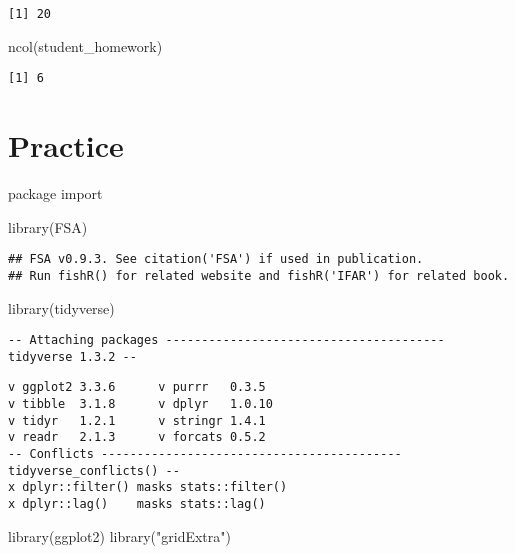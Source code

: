 \documentclass[
  letterpaper,
  DIV=11,
  numbers=noendperiod]{scrartcl}
\newenvironment{Shaded}{\begin{snugshade}}{\end{snugshade}}
\newcommand{\FunctionTok}[1]{\textcolor[rgb]{0.28,0.35,0.67}{#1}}
\newcommand{\NormalTok}[1]{\textcolor[rgb]{0.00,0.23,0.31}{#1}}
\newcommand{\StringTok}[1]{\textcolor[rgb]{0.13,0.47,0.30}{#1}}
\begin{document}
\begin{verbatim}
[1] 20
\end{verbatim}

\begin{Shaded}
\begin{Highlighting}[]
\FunctionTok{ncol}\NormalTok{(student\_homework)}
\end{Highlighting}
\end{Shaded}

\begin{verbatim}
[1] 6
\end{verbatim}

\hypertarget{practice}{%
\section{Practice}\label{practice}}

package import

\begin{Shaded}
\begin{Highlighting}[]
\FunctionTok{library}\NormalTok{(FSA)}
\end{Highlighting}
\end{Shaded}

\begin{verbatim}
## FSA v0.9.3. See citation('FSA') if used in publication.
## Run fishR() for related website and fishR('IFAR') for related book.
\end{verbatim}

\begin{Shaded}
\begin{Highlighting}[]
\FunctionTok{library}\NormalTok{(tidyverse)}
\end{Highlighting}
\end{Shaded}

\begin{verbatim}
-- Attaching packages --------------------------------------- tidyverse 1.3.2 --
\end{verbatim}

\begin{verbatim}
v ggplot2 3.3.6      v purrr   0.3.5 
v tibble  3.1.8      v dplyr   1.0.10
v tidyr   1.2.1      v stringr 1.4.1 
v readr   2.1.3      v forcats 0.5.2 
-- Conflicts ------------------------------------------ tidyverse_conflicts() --
x dplyr::filter() masks stats::filter()
x dplyr::lag()    masks stats::lag()
\end{verbatim}

\begin{Shaded}
\begin{Highlighting}[]
\FunctionTok{library}\NormalTok{(ggplot2)}
\FunctionTok{library}\NormalTok{(}\StringTok{"gridExtra"}\NormalTok{)}
\end{Highlighting}
\end{Shaded}
\end{document}
